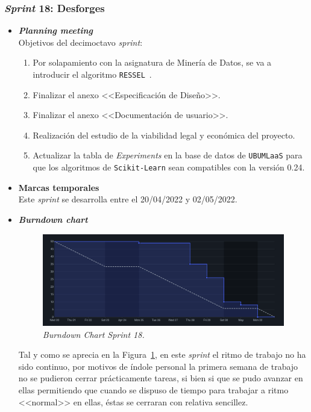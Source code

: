 \subsubsection{\textit{Sprint} 18: Desforges}
\begin{itemize}
\item \textbf{\textit{Planning meeting}}\\
Objetivos del decimoctavo \textit{sprint}:
\begin{enumerate}
\item Por solapamiento con la asignatura de Minería de Datos, se va a introducir el algoritmo \texttt{RESSEL}~\cite{de2021reliable}.
\item Finalizar el anexo <<Especificación de Diseño>>.
\item Finalizar el anexo <<Documentación de usuario>>.
\item Realización del estudio de la viabilidad legal y económica del proyecto.
\item Actualizar la tabla de \emph{Experiments} en la base de datos de \texttt{UBUMLaaS} para que los algoritmos de \texttt{Scikit-Learn} sean compatibles con la versión 0.24.
\end{enumerate}

\item \textbf{Marcas temporales}\\
Este \textit{sprint} se desarrolla entre el 20/04/2022 y 02/05/2022.

\item \textbf{\textit{Burndown chart}}\\
\begin{figure}
\begin{center}
\includegraphics[width=\textwidth]{../img/anexos/sprints/BD-Sprint18}
\caption{\textit{Burndown Chart Sprint 18.}}\label{fig:BD-Sprint18}
\end{center}
\end{figure}
Tal y como se aprecia en la Figura~\ref{fig:BD-Sprint18}, en este \textit{sprint} el ritmo de trabajo no ha sido continuo, por motivos de índole personal la primera semana de trabajo no se pudieron cerrar prácticamente tareas, si bien si que se pudo avanzar en ellas permitiendo que cuando se dispuso de tiempo para trabajar a ritmo <<normal>> en ellas, éstas se cerraran con relativa sencillez.


\end{itemize}
